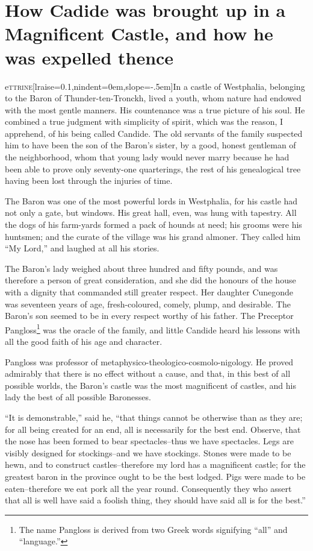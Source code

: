 \chapter{How Cadide was brought up in a Magnificent Castle, and how he was expelled thence}
\lettrine[lraise=0.1,nindent=0em,slope=-.5em]{e}{ttrine}[lraise=0.1,nindent=0em,slope=-.5em]{In}{} a castle of Westphalia, belonging to the Baron of Thunder-ten-Tronckh, lived a youth, whom nature had endowed with the most gentle manners. His countenance was a true picture of his soul. He 
combined a true judgment with simplicity of spirit, which was the reason, I apprehend, of his being called Candide. The old servants of the family suspected him to have been the son of the Baron's sister, by a good, honest gentleman of the neighborhood, whom that young lady would never marry because he had been able to prove only seventy-one quarterings, the rest of his genealogical tree having been lost through the injuries of time.

The Baron was one of the most powerful lords in Westphalia, for his castle had not only a gate, but windows. His great hall, even, was hung with tapestry. All the dogs of his farm-yards formed a pack of hounds at need; his grooms were his huntsmen; and the curate of the village was his grand almoner. They called him ``My Lord,'' and laughed at all his stories.

The Baron's lady weighed about three hundred and fifty pounds, and was therefore a person of great consideration, and she did the honours of the house with a dignity that commanded still greater respect. Her daughter Cunegonde was seventeen years of age, fresh-coloured, comely, plump, and desirable. The Baron's son seemed to be in every respect worthy of his father. The Preceptor Pangloss\footnote{The name Pangloss is derived from two Greek words signifying ``all'' and ``language.''} was the oracle of the family, and little Candide heard his lessons with all the good faith of his age and character.

Pangloss was professor of metaphysico-theologico-cosmolo-nigology. He proved admirably that there is no effect without a cause, and that, in this best of all possible worlds, the Baron's castle was the most magnificent of castles, and his lady the best of all possible Baronesses.

``It is demonstrable,'' said he, ``that things cannot be otherwise than as they are; for all being created for an end, all is necessarily for the best end. Observe, that the nose has been formed to bear spectacles--thus we have spectacles. Legs are visibly designed for stockings--and we have stockings. Stones were made to be hewn, and to construct castles--therefore my lord has a magnificent castle; for the greatest baron in the province ought to be the best lodged. Pigs were made to be eaten--therefore we eat pork all the year round. Consequently they who assert that all is well have said a foolish thing, they should have said all is for the best.''

